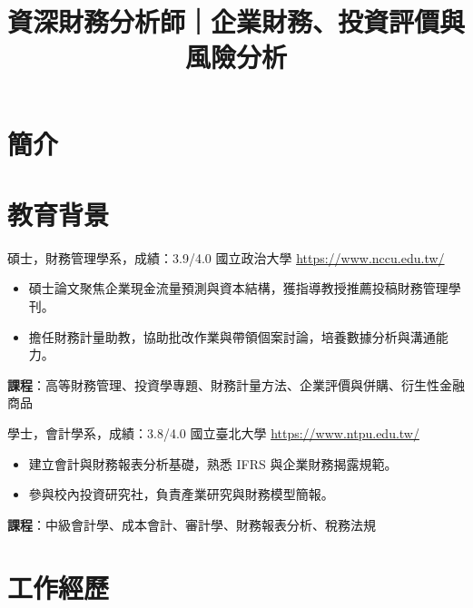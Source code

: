 \documentclass[a4paper, serif, 10pt]{moderncv}
\title{資深財務分析師｜企業財務、投資評價與風險分析}
\begin{document}
\maketitle

\section{簡介}

\section{教育背景}

        {碩士，財務管理學系，成績：3.9/4.0}
        {國立政治大學}
        {\url{https://www.nccu.edu.tw/}}
        {}
        {\begin{itemize}
\item 碩士論文聚焦企業現金流量預測與資本結構，獲指導教授推薦投稿財務管理學刊。
\item 擔任財務計量助教，協助批改作業與帶領個案討論，培養數據分析與溝通能力。
\end{itemize}
\textbf{課程}：高等財務管理、投資學專題、財務計量方法、企業評價與併購、衍生性金融商品}

        {學士，會計學系，成績：3.8/4.0}
        {國立臺北大學}
        {\url{https://www.ntpu.edu.tw/}}
        {}
        {\begin{itemize}
\item 建立會計與財務報表分析基礎，熟悉 IFRS 與企業財務揭露規範。
\item 參與校內投資研究社，負責產業研究與財務模型簡報。
\end{itemize}
\textbf{課程}：中級會計學、成本會計、審計學、財務報表分析、稅務法規}
\section{工作經歷}
\end{document}
